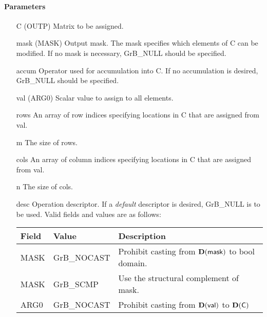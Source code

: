 \paragraph{Parameters}

\begin{itemize}[leftmargin=1.1in]
    \item[{\sf C}]   ({\sf OUTP}) Matrix to be assigned.

    \item[{\sf mask}] ({\sf MASK}) Output mask. The mask specifies which elements
    of {\sf C} can be modified. If no mask is necessary, {\sf GrB\_NULL} should be specified.

    \item[{\sf accum}] Operator used for accumulation into {\sf C}.  If no accumulation
                        is desired, {\sf GrB\_NULL} should be specified.

    \item[{\sf val}]   ({\sf ARG0}) Scalar value to assign to all elements.
    \item[{\sf rows}]  An array of row indices specifying locations in {\sf C} that
                       are assigned from {\sf val}.
    \item[{\sf m}]     The size of {\sf rows}.
    \item[{\sf cols}]  An array of column indices
                       specifying locations in {\sf C} that are assigned from {\sf val}.
    \item[{\sf n}]     The size of {\sf cols}.


    \item[{\sf desc}]   Operation descriptor. If a
    \emph{default} descriptor is desired, {\sf GrB\_NULL} is to be
    used. Valid fields and values are as follows: \\
    \begin{tabular}{lll}
    Field  & Value & Description \\
    \hline
    {\sf MASK} & {\sf GrB\_NOCAST} & Prohibit casting from $\bold{D}({\sf mask})$ to {\sf bool} domain. \\
    {\sf MASK} & {\sf GrB\_SCMP} & Use the structural complement of {\sf mask}. \\
    {\sf ARG0} & {\sf GrB\_NOCAST} & Prohibit casting from $\bold{D}({\sf val})$ to $\bold{D}({\sf C})$ \\
    \end{tabular}

\end{itemize}

